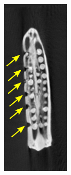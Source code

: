 \documentclass[journal]{IEEEtran}
\begin{document}
\begin{figure}[!h]
  \begin{subfigure}[b]{0.18\linewidth}
        \includegraphics[width=\textwidth]{../images/okra/template4_marked.png}

\end{subfigure}
\end{figure}
\end{document}
